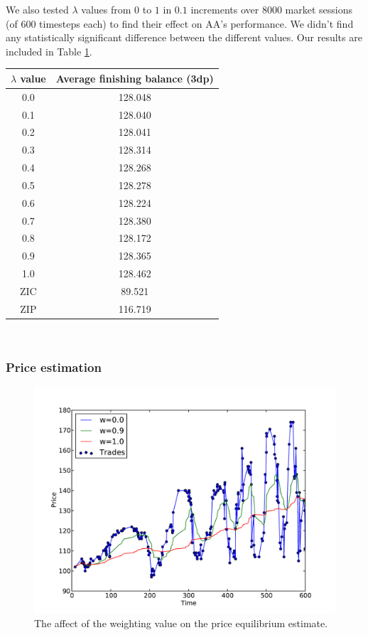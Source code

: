 \documentclass[preprint]{acm_proc_article-sp} %
\begin{document}
We also tested $\lambda$ values from $0$ to $1$ in $0.1$ increments over 8000 market sessions (of 
600 timesteps each) to find their effect on AA's performance. We didn't find any statistically 
significant difference between the different values. Our results are included in Table \ref{tbl:lambda_results}.
\begin{table}[h]
  \centering
  \label{tbl:lambda_results}
  \begin{tabular}{ | c | c | }
    \hline
    \textbf{$\lambda$ value} & \textbf{Average finishing balance (3dp)} \\
    \hline
    0.0 & 128.048 \\
    0.1 & 128.040 \\
    0.2 & 128.041 \\
    0.3 & 128.314 \\
    0.4 & 128.268 \\
    0.5 & 128.278 \\
    0.6 & 128.224 \\
    0.7 & 128.380 \\
    0.8 & 128.172 \\
    0.9 & 128.365 \\
    1.0 & 128.462 \\
    \hline \hline
    ZIC & 89.521 \\
    ZIP & 116.719 \\
    \hline
  \end{tabular}
\end{table}\\


\subsubsection{Price estimation} \label{sec:AA_price_estimation}
\begin{figure}
  \centering
  \label{fig:equilibrium}
  \includegraphics[width=\columnwidth]{graphs_and_stats/graph_equilibriums.pdf}
  \caption{The affect of the weighting value on the price equilibrium
  estimate.}
\end{figure}
\end{document}
